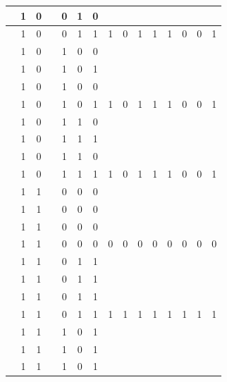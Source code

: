 \begin{table}[!tb]
\begin{tabular}{|c|c|c|c|c|c|c|c|c|c|c|c|c|c|c|}
        \rowcolor{yellow!40}  & 1 & 0 &  & 0 & 1 & 0 &  &  &  &  &  &  &  &  \\ \hline
        \rowcolor{yellow!40}  & 1 & 0 &  & 0 & 1 & 1 & 1 & 0 & 1 & 1 & 1 & 0 & 0 & 1 \\ \hline
        \rowcolor{gray!40}  & 1 & 0 &  & 1 & 0 & 0 &  &  &  &  &  &  &  &  \\ \hline
        \rowcolor{gray!40}  & 1 & 0 &  & 1 & 0 & 1 &  &  &  &  &  &  &  &  \\ \hline
        \rowcolor{gray!40}  & 1 & 0 &  & 1 & 0 & 0 &  &  &  &  &  &  &  &  \\ \hline
        \rowcolor{gray!40}  & 1 & 0 &  & 1 & 0 & 1 & 1 & 0 & 1 & 1 & 1 & 0 & 0 & 1 \\ \hline
        \rowcolor{blue!40}  & 1 & 0 &  & 1 & 1 & 0 &  &  &  &  &  &  &  &  \\ \hline
        \rowcolor{blue!40}  & 1 & 0 &  & 1 & 1 & 1 &  &  &  &  &  &  &  &  \\ \hline
        \rowcolor{blue!40}  & 1 & 0 &  & 1 & 1 & 0 &  &  &  &  &  &  &  &  \\ \hline
        \rowcolor{blue!40}  & 1 & 0 &  & 1 & 1 & 1 & 1 & 0 & 1 & 1 & 1 & 0 & 0 & 1 \\ \hline
        \rowcolor{red!40}  & 1 & 1 &  & 0 & 0 & 0 &  &  &  &  &  &  &  &  \\ \hline
        \rowcolor{red!40}  & 1 & 1 &  & 0 & 0 & 0 &  &  &  &  &  &  &  &  \\ \hline
        \rowcolor{red!40}  & 1 & 1 &  & 0 & 0 & 0 &  &  &  &  &  &  &  &  \\ \hline
        \rowcolor{red!40}  & 1 & 1 &  & 0 & 0 & 0 & 0 & 0 & 0 & 0 & 0 & 0 & 0 & 0 \\ \hline
        \rowcolor{green!40}  & 1 & 1 &  & 0 & 1 & 1 &  &  &  &  &  &  &  &  \\ \hline
        \rowcolor{green!40}  & 1 & 1 &  & 0 & 1 & 1 &  &  &  &  &  &  &  &  \\ \hline
        \rowcolor{green!40}  & 1 & 1 &  & 0 & 1 & 1 &  &  &  &  &  &  &  &  \\ \hline
        \rowcolor{green!40}  & 1 & 1 &  & 0 & 1 & 1 & 1 & 1 & 1 & 1 & 1 & 1 & 1 & 1 \\ \hline
        \rowcolor{yellow!40}  & 1 & 1 &  & 1 & 0 & 1 &  &  &  &  &  &  &  &  \\ \hline
        \rowcolor{yellow!40}  & 1 & 1 &  & 1 & 0 & 1 &  &  &  &  &  &  &  &  \\ \hline
        \rowcolor{yellow!40}  & 1 & 1 &  & 1 & 0 & 1 &  &  &  &  &  &  &  &  \\ \hline

\end{tabular}
\end{table}
